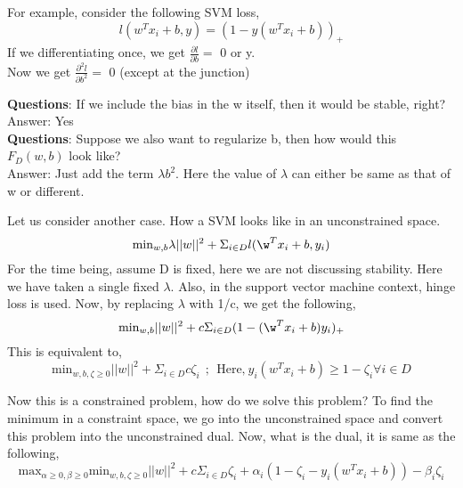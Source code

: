 \documentclass[11pt, twosides]{article}
\begin{document}
For example, consider the following SVM loss,
\begin{equation*}
    l(w^Tx_i+b,y) = (1-y(w^Tx_i + b))_+
\end{equation*}
If we differentiating once, we get $\frac{\partial l}{\partial b} = $ 0 or y. \\
Now we get $\frac{\partial^2 l}{\partial b^2} = $ 0 (except at the junction)

\textbf{Questions}: If we include the bias in the w itself, then it would be stable, right?\\
Answer: \color{blue} Yes\\
\color{black}
\textbf{Questions}: Suppose we also want to regularize b, then how would this $F_D(w,b)$ look like?\\
Answer: \color{blue} Just add the term $\lambda b^2$. Here the value of $\lambda$ can either be same as that of w or different.
\color{black}

Let us consider another case. How a SVM looks like in an unconstrained space. 
\begin{equation*}
    \text{min}_{w,b} \lambda||w||^2 + \Sigma_{i\in D}l(\w^T x_i + b,y_i)
\end{equation*}
For the time being, assume D is fixed, here we are not discussing stability. Here we have taken a single fixed $\lambda$. Also, in the support vector machine context, hinge loss is used. Now, by replacing $\lambda$ with 1/c, we get the following,
\begin{equation}
    \text{min}_{w,b} ||w||^2 + c\Sigma_{i\in D}(1-(\w^T x_i + b)y_i)_+
    \label{main}
\end{equation}
This is equivalent to,
\begin{equation}
    \text{min}_{w,b,\zeta\geq 0} ||w||^2 + \Sigma_{i\in D}c\zeta_i \ \ ; \ \ \text{Here,} \ y_i(w^Tx_i + b) \geq 1- \zeta_i \forall i \in D
\end{equation}

Now this is a constrained problem, how do we solve this problem? To find the minimum in a constraint space, we go into the unconstrained space and convert this problem into the unconstrained dual. Now, what is the dual, it is same as the following,
\begin{equation}
    \text{max}_{\alpha\geq 0, \beta \geq 0} \text{min}_{w,b,\zeta\geq 0} ||w||^2 + c\Sigma_{i\in D}\zeta_i + \alpha_i(1-\zeta_i - y_i(w^Tx_i+b)) - \beta_i\zeta_i
\end{equation}
\end{document}
